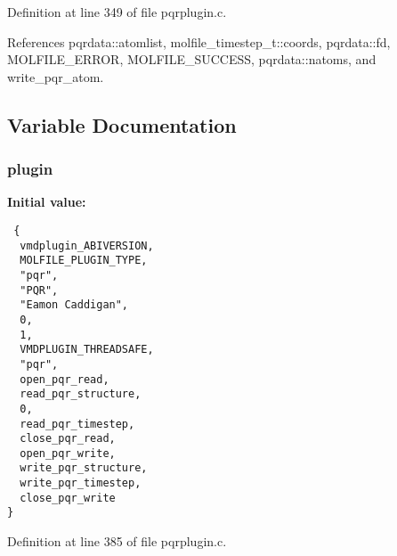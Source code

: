 Definition at line 349 of file pqrplugin.c.

References pqrdata::atomlist, molfile\_\-timestep\_\-t::coords, pqrdata::fd, MOLFILE\_\-ERROR, MOLFILE\_\-SUCCESS, pqrdata::natoms, and write\_\-pqr\_\-atom.

\subsection{Variable Documentation}
\subsubsection{ plugin\hspace{0.3cm}{\tt  [static]}}\label{pqrplugin_8c_a1}


{\bf Initial value:}

\footnotesize\begin{verbatim} {
  vmdplugin_ABIVERSION,         
  MOLFILE_PLUGIN_TYPE,          
  "pqr",                        
  "PQR",                        
  "Eamon Caddigan",             
  0,                            
  1,                            
  VMDPLUGIN_THREADSAFE,         
  "pqr",                        
  open_pqr_read,
  read_pqr_structure,
  0,
  read_pqr_timestep,
  close_pqr_read,
  open_pqr_write,
  write_pqr_structure,
  write_pqr_timestep,
  close_pqr_write
}\end{verbatim}\normalsize 


Definition at line 385 of file pqrplugin.c.